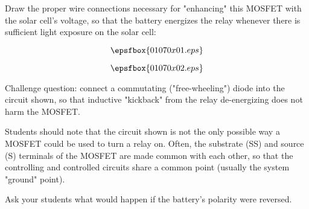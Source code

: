 

Draw the proper wire connections necessary for "enhancing" this MOSFET with the solar cell's voltage, so that the battery energizes the relay whenever there is sufficient light exposure on the solar cell:

$$\epsfbox{01070x01.eps}$$







$$\epsfbox{01070x02.eps}$$

\vskip 10pt

Challenge question: connect a commutating ("free-wheeling") diode into the circuit shown, so that inductive "kickback" from the relay de-energizing does not harm the MOSFET.







Students should note that the circuit shown is not the only possible way a MOSFET could be used to turn a relay on.  Often, the substrate (SS) and source (S) terminals of the MOSFET are made common with each other, so that the controlling and controlled circuits share a common point (usually the system "ground" point).

Ask your students what would happen if the battery's polarity were reversed.




